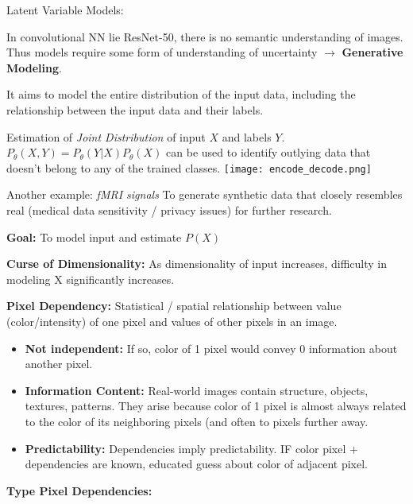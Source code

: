 \documentclass[twocolumn]{article}
\begin{document}
\begin{literaturepaper}{Latent Variable Models:}
\label{background-info-2}
\small

In convolutional NN lie ResNet-50, there is no semantic understanding of images. Thus models require some form of understanding of uncertainty $\rightarrow$ \textbf{Generative Modeling}.

It aims to model the entire distribution of the input data, including the relationship between the input data and their labels.

Estimation of \textit{Joint Distribution} of input $X$ and labels $Y$.
$P_\theta(X, Y) = P_\theta(Y|X) P_\theta(X)$ can be used to identify outlying data that doesn't belong to any of the trained classes. 
\texttt{[image: encode\_decode.png]}

Another example: \textit{fMRI signals} To generate synthetic data that closely resembles real (medical data sensitivity / privacy issues) for further research.

\textbf{Goal:} To model input and estimate $P(X)$ 

\textbf{Curse of Dimensionality:} As dimensionality of input increases, difficulty in modeling X significantly increases.

\textbf{Pixel Dependency:} Statistical / spatial relationship between value (color/intensity) of one pixel and values of other pixels in an image. 
\begin{itemize}
    \item \textbf{Not independent:} If so, color of 1 pixel would convey 0 information about another pixel.
    \item \textbf{Information Content:} Real-world images contain structure, objects, textures, patterns. They arise because color of 1 pixel is almost always related to the color of its neighboring pixels (and often to pixels further away.
    \item \textbf{Predictability:} Dependencies imply predictability. IF color pixel $+$ dependencies are known, educated guess about color of adjacent pixel.
\end{itemize}

\textbf{Type Pixel Dependencies:}


\end{literaturepaper}
\end{document}
